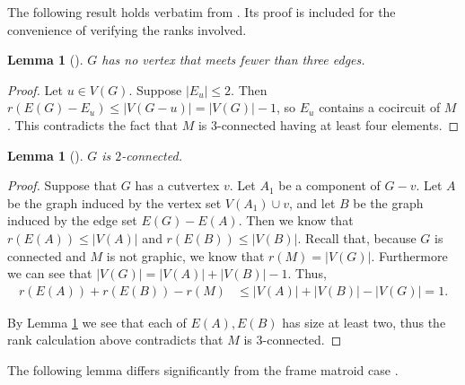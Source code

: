 \documentclass[12pt]{article}
\newtheorem{lemma}[theorem]{Lemma}
\theoremstyle{definition}
\theoremstyle{plain} %
\begin{document}
The following result holds verbatim from \cite[Lemma 3.2]{Fife-Mayhew-Oxley-Semple2020}. Its proof is included for the convenience of verifying the ranks involved.
\begin{lemma}[{\cite[Lemma 3.2]{Fife-Mayhew-Oxley-Semple2020}}]\label{lem: min degree is at least 3}
$G$ has no vertex that meets fewer than three edges.
\end{lemma}
\begin{proof}
Let $u\in V(G)$. Suppose $\lvert E_u\rvert\leq2$. Then $r(E(G)-E_u)\leq\lvert V(G-u)\rvert=\lvert V(G)\rvert-1$, so $E_u$ contains a cocircuit of $M$. This contradicts the fact that $M$ is 3-connected having at least four elements.
\end{proof}



\begin{lemma}[{\cite[Lemma 3.3]{Fife-Mayhew-Oxley-Semple2020}}] \label{lem: G is 2-connected}
$G$ is $2$-connected.
\end{lemma}
\begin{proof}
Suppose that $G$ has a cutvertex $v$. Let $A_1$ be a component of $G-v$. Let $A$ be the graph induced by the vertex set $V(A_1)\cup v$, and let $B$ be the graph induced by the edge set $E(G)-E(A)$. Then we know that $r(E(A)) \leq |V(A)|$ and $r(E(B)) \leq |V(B)|$. Recall that, because $G$ is connected and $M$ is not graphic, we know that $r(M) = \lvert V(G)\rvert$. 
Furthermore we can see that $|V(G)| = |V(A)|+|V(B)|-1$. Thus,
\begin{align*}
    r(E(A))+r(E(B))-r(M) &\leq |V(A)|+|V(B)|-|V(G)| = 1.
\end{align*}

By Lemma \ref{lem: min degree is at least 3} we see that each of $E(A),E(B)$ has size at least two, thus the rank calculation above contradicts that $M$ is 3-connected.
\end{proof}

The following lemma differs significantly from the frame matroid case \cite[Lemma 3.4]{Fife-Mayhew-Oxley-Semple2020}.
\end{document}
